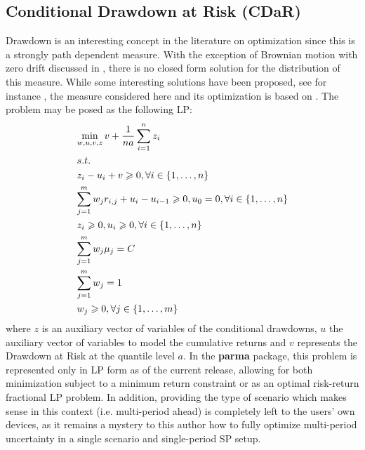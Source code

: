 \subsection{Conditional Drawdown at Risk (CDaR)}
Drawdown is an interesting concept in the literature on optimization since
this is a strongly path dependent measure. With the exception of Brownian
motion with zero drift discussed in , there is no
closed form solution for the distribution of this measure. While some
interesting solutions have been proposed, see for instance
, the measure considered here and its
optimization is based on . The problem may be posed
as the following LP:
\begin{equation}
\begin{gathered}
  \mathop {\min }\limits_{w,u,v,z} v + \frac{1}{{na}}\sum\limits_{i=1}^n {{z_i}}  \hfill \\
  s.t. \hfill \\
  {z_i} - {u_i} + v \geqslant 0,\forall i \in \left\{ {1,\dots,n} \right\} \hfill \\
  \sum\limits_{j=1}^m {{w_j}{r_{i,j}} + {u_i} - {u_{i - 1}}}  \geqslant 0,{u_0}=0,\forall i \in \left\{ {1,\dots,n} \right\} \hfill \\
  {z_i} \geqslant 0,{u_i} \geqslant 0,\forall i \in \left\{ {1,\dots,n} \right\} \hfill \\
  \sum\limits_{j=1}^m {{w_j}{\mu _j}=C}  \hfill \\
  \sum\limits_{j=1}^m {{w_j}=1}  \hfill \\
  {w_j} \geqslant 0,\forall j \in \left\{ {1,\dots,m} \right\} \hfill \\
\end{gathered}
\end{equation}
where $z$ is an auxiliary vector of variables of the conditional drawdowns,
$u$ the auxiliary vector of variables to model the cumulative returns and
$v$ represents the Drawdown at Risk at the quantile level $a$. In the
\textbf{parma} package, this problem is represented only in LP form as of the
current release, allowing for both minimization subject to a minimum return
constraint or as an optimal risk-return fractional LP problem. In addition,
providing the type of scenario which makes sense in this context (i.e.
multi-period ahead) is completely left to the users' own devices, as it
remains a mystery to this author how to fully optimize multi-period
uncertainty in a single scenario and single-period SP setup.

